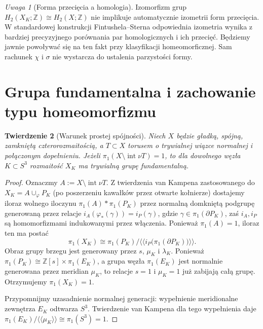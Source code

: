 \documentclass[11pt,a4paper]{report}
\numberwithin{equation}{section}
\theoremstyle{plain}
\newtheorem{twierdzenie}{Twierdzenie}[section]
\theoremstyle{definition}
\theoremstyle{remark}
\newtheorem{uwaga}[twierdzenie]{Uwaga}
\begin{document}
\begin{uwaga}[Forma przecięcia a homologia]
Izomorfizm grup $H_2(X_K;\mathbb Z)\cong H_2(X;\mathbb Z)$
nie implikuje automatycznie izometrii form przecięcia.
W standardowej konstrukcji Fintushela--Sterna
odpowiednia izometria wynika z bardziej precyzyjnego
porównania par homologicznych i ich przecięć.
Będziemy jawnie powoływać się na ten fakt przy
klasyfikacji homeomorficznej. Sam rachunek $\chi$ i
$\sigma$ nie wystarcza do ustalenia parzystości formy.
\end{uwaga}

\section{Grupa fundamentalna i zachowanie typu homeomorfizmu}
\label{sec:tg-ks-pi1}

\begin{twierdzenie}[Warunek prostej spójności]
\label{thm:tg-ks-pi1}
Niech $X$ będzie gładką, spójną, zamkniętą
czterorozmaitością, a $T\subset X$ torusem o
trywialnej wiązce normalnej i połączonym dopełnieniu.
Jeżeli $\pi_1(X\setminus\operatorname{int}\nu T)=1$,
to dla dowolnego węzła $K\subset S^3$
rozmaitość $X_K$ ma trywialną grupę fundamentalną.
\end{twierdzenie}

\begin{proof}
Oznaczmy $A:=X\setminus\operatorname{int}\nu T$.
Z twierdzenia van Kampena zastosowanego do
$X_K=A\cup_\varphi P_K$ (po poszerzeniu kawałków
przez otwarte kołnierze) dostajemy iloraz wolnego
iloczynu $\pi_1(A)*\pi_1(P_K)$ przez normalną
domkniętą podgrupę generowaną przez relacje
$i_A(\varphi_*(\gamma))=i_P(\gamma)$,
gdzie $\gamma\in\pi_1(\partial P_K)$, zaś $i_A,i_P$
są homomorfizmami indukowanymi przez włączenia.
Ponieważ $\pi_1(A)=1$, iloraz ten ma postać
\[
\pi_1(X_K)\cong
\pi_1(P_K)\big/\langle\!\langle
  i_P\bigl(\pi_1(\partial P_K)\bigr)
\rangle\!\rangle.
\]
Obraz grupy brzegu jest generowany przez $s$, $\mu_K$
i $\lambda_K$. Ponieważ
$\pi_1(P_K)\cong\mathbb Z[s]\times\pi_1(E_K)$,
a grupa węzła $\pi_1(E_K)$ jest normalnie generowana
przez meridian $\mu_K$, to relacje $s=1$ i
$\mu_K=1$ już zabijają całą grupę. Otrzymujemy
$\pi_1(X_K)=1$.

Przypomnijmy uzasadnienie normalnej generacji:
wypełnienie meridionalne zewnętrza $E_K$
odtwarza $S^3$. Twierdzenie van Kampena dla tego
wypełnienia daje
$\pi_1(E_K)/\langle\!\langle\mu_K\rangle\!\rangle
\cong\pi_1(S^3)=1$.
\end{proof}
\end{document}
